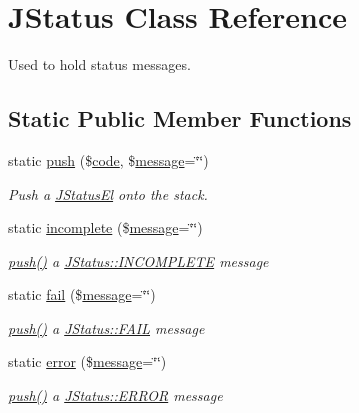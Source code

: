 \hypertarget{classJStatus}{\section{J\-Status Class Reference}
\label{classJStatus}
}


Used to hold status messages.  


\subsection*{Static Public Member Functions}
\begin{DoxyCompactItemize}
\item 
static \hyperlink{classJStatus_a4dfe11792482154033e973f8e595eb88}{push} (\$\hyperlink{classJStatus_abf45c135b0e7a85afcc29f4e6170dede}{code}, \$\hyperlink{classJStatus_aaae0b2dc83cdb147d18af1aa65abd353}{message}=\char`\"{}\char`\"{})
\begin{DoxyCompactList}\small\item\em Push a \hyperlink{classJStatusEl}{J\-Status\-El} onto the stack. \end{DoxyCompactList}\item 
static \hyperlink{classJStatus_a56f5e27a2d1ce9f37c33fd4f04957982}{incomplete} (\$\hyperlink{classJStatus_aaae0b2dc83cdb147d18af1aa65abd353}{message}=\char`\"{}\char`\"{})
\begin{DoxyCompactList}\small\item\em \hyperlink{classJStatus_a4dfe11792482154033e973f8e595eb88}{push()} a \hyperlink{classJStatus_a7da9c102991a4a5a873fa435e6820dae}{J\-Status\-::\-I\-N\-C\-O\-M\-P\-L\-E\-T\-E} message \end{DoxyCompactList}\item 
static \hyperlink{classJStatus_ae8908e43cfb416ff30e6a06b039907cb}{fail} (\$\hyperlink{classJStatus_aaae0b2dc83cdb147d18af1aa65abd353}{message}=\char`\"{}\char`\"{})
\begin{DoxyCompactList}\small\item\em \hyperlink{classJStatus_a4dfe11792482154033e973f8e595eb88}{push()} a \hyperlink{classJStatus_a42def017ffd8cbba31196409472ae94b}{J\-Status\-::\-F\-A\-I\-L} message \end{DoxyCompactList}\item 
static \hyperlink{classJStatus_a8cf0d53e8bd052ead9d755785f4e727f}{error} (\$\hyperlink{classJStatus_aaae0b2dc83cdb147d18af1aa65abd353}{message}=\char`\"{}\char`\"{})
\begin{DoxyCompactList}\small\item\em \hyperlink{classJStatus_a4dfe11792482154033e973f8e595eb88}{push()} a \hyperlink{classJStatus_adae6f9cc64c27ec125bbb36731a036c1}{J\-Status\-::\-E\-R\-R\-O\-R} message \end{DoxyCompactList}\item 

\end{DoxyCompactItemize}
